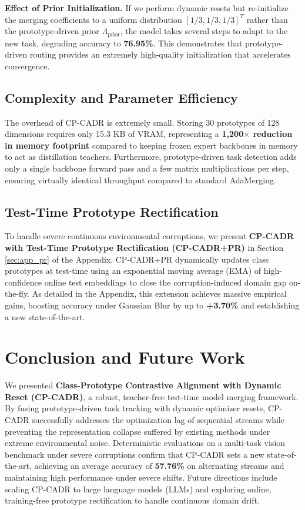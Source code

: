 \documentclass{article}
\theoremstyle{plain}
\theoremstyle{definition}
\theoremstyle{remark}
\begin{document}
\textbf{Effect of Prior Initialization.} If we perform dynamic resets but re-initialize the merging coefficients to a uniform distribution $[1/3, 1/3, 1/3]^T$ rather than the prototype-driven prior $\Lambda_{\text{prior}}$, the model takes several steps to adapt to the new task, degrading accuracy to \textbf{76.95\%}. This demonstrates that prototype-driven routing provides an extremely high-quality initialization that accelerates convergence.

\subsection{Complexity and Parameter Efficiency}
The overhead of CP-CADR is extremely small. Storing 30 prototypes of 128 dimensions requires only 15.3 KB of VRAM, representing a \textbf{1,200$\times$ reduction in memory footprint} compared to keeping frozen expert backbones in memory to act as distillation teachers. Furthermore, prototype-driven task detection adds only a single backbone forward pass and a few matrix multiplications per step, ensuring virtually identical throughput compared to standard AdaMerging.

\subsection{Test-Time Prototype Rectification}
To handle severe continuous environmental corruptions, we present \textbf{CP-CADR with Test-Time Prototype Rectification (CP-CADR+PR)} in Section \ref{sec:app_pr} of the Appendix. CP-CADR+PR dynamically updates class prototypes at test-time using an exponential moving average (EMA) of high-confidence online test embeddings to close the corruption-induced domain gap on-the-fly. As detailed in the Appendix, this extension achieves massive empirical gains, boosting accuracy under Gaussian Blur by up to \textbf{+3.70\%} and establishing a new state-of-the-art.

\section{Conclusion and Future Work}
\label{sec:conclusion}
We presented \textbf{Class-Prototype Contrastive Alignment with Dynamic Reset (CP-CADR)}, a robust, teacher-free test-time model merging framework. By fusing prototype-driven task tracking with dynamic optimizer resets, CP-CADR successfully addresses the optimization lag of sequential streams while preventing the representation collapse suffered by existing methods under extreme environmental noise. Deterministic evaluations on a multi-task vision benchmark under severe corruptions confirm that CP-CADR sets a new state-of-the-art, achieving an average accuracy of \textbf{57.76\%} on alternating streams and maintaining high performance under severe shifts. Future directions include scaling CP-CADR to large language models (LLMs) and exploring online, training-free prototype rectification to handle continuous domain drift.
\end{document}

